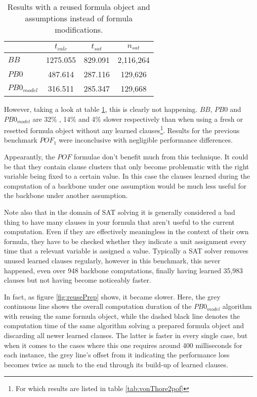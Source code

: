 \begin{table}[h]
\centering
\begin{tabular}{l| c c  c}
& $t_{calc}$ & $t_{sat}$ &  $n_{sat}$ \\
\hline
$BB$ & 1275.055 & 829.091 &  2,116,264 \\
$PB0$ & 487.614 & 287.116 &  129,626 \\
$PB0_{model}$ & 316.511 & 285.347 & 129,668 \\
\end{tabular}
\caption{Results with a reused formula object and assumptions instead of formula modifications.}
\label{tab:pofAssump}
\end{table}

However, taking a look at table \ref{tab:pofAssump}, this is clearly not happening. $BB$, $PB0$ and $PB0_{model}$ are 32\% , 14\% and 4\% slower respectively than when using a fresh or resetted formula object without any learned clauses\footnote{For which results are listed in table \ref{tab:vonThore2pof}}. Results for the previous benchmark $POF_1$ were inconclusive with negligible performance differences.

Appearantly, the $POF$ formulae don't benefit much from this technique. It could be that they contain clause clusters that only become problematic with the right variable being fixed to a certain value. In this case the clauses learned during the computation of a backbone under one assumption would be much less useful for the backbone under another assumption. 

Note also that in the domain of SAT solving it is generally considered a bad thing to have many clauses in your formula that aren't useful to the current computation. Even if they are effectively meaningless in the context of their own formula, they have to be checked whether they indicate a unit assignment every time that a relevant variable is assigned a value. Typically a SAT solver removes unused learned clauses regularly, however in this benchmark, this never happened, even over 948 backbone computations, finally having learned 35,983 clauses but not having become noticeably faster.

In fact, as figure \ref{fig:reusePrep} shows, it became slower. Here, the grey continuous line shows the overall computation duration of the $PB0_{model}$ algorithm with reusing the same formula object, while the dashed black line denotes the computation time of the same algorithm solving a prepared formula object and discarding all newer learned clauses. The latter is faster in every single case, but when it comes to the cases where this one requires around 400 milliseconds for each instance, the grey line's offset from it indicating the performance loss becomes twice as much to the end through its build-up of learned clauses. 


